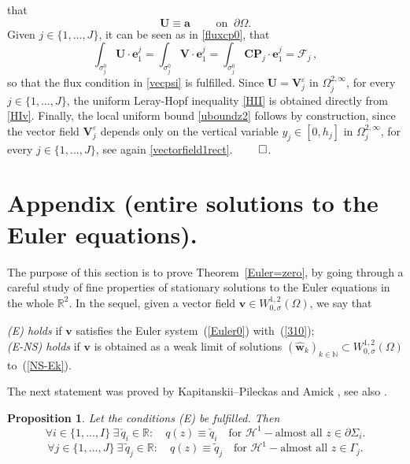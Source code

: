 \documentclass[11pt]{article}
\newtheorem{proposition}[theorem]{Proposition}
\numberwithin{equation}{section}
\numberwithin{figure}{section}
\newcommand{\R}{\mathbb{R}}
\def\R{{\mathbb R}}
\def\Fe{{\mathcal F}}
\def\Ha{{\mathscr H}}
\def\ve{{\mathbf v}}
\def\ee{{\mathbf e}}
\begin{document}
that $$\mathbf{U} \equiv \mathbf{a}\qquad\mbox{ on }\ \partial \Omega.$$ Given $j \in \{ 1,\dots,J\}$, it can be seen
as in \eqref{fluxcp0}, that
$$
\int_{\sigma_j^0} \mathbf{U} \cdot \ee_1^j = \int_{\sigma_j^0} \mathbf{V} \cdot \ee_1^j = \int_{\sigma_j^0} \mathbf{CP}_{j} \cdot \ee_1^j = \Fe_j \, ,
$$
so that the flux condition in \eqref{vecpsi} is fulfilled. Since $\mathbf{U} = \mathbf{V}^{\varepsilon}_{j}$ in
$\Omega_{j}^{2,\infty}$, for every $j \in \{ 1,\dots,J\}$, the uniform Leray-Hopf inequality \eqref{HII} is obtained directly from \eqref{HIv}.
Finally, the local uniform bound \eqref{uboundz2} follows by construction, since the vector field $\mathbf{V}^{\varepsilon}_{j}$ depends only
on the vertical variable $y_{j} \in [0,h_{j}]$ in $\Omega_{j}^{2,\infty}$, for every $j \in \{ 1,\dots,J\}$, see again \eqref{vectorfield1rect}.
\hfill$\qed$. 



\section{Appendix (entire solutions to the  Euler equations).} \label{poet2}
The purpose of this section is to prove Theorem~\ref{Euler=zero}, by going through a careful study of fine properties of stationary solutions to the Euler equations in the whole $\mathbb{R}^2$. In the sequel, given a vector field $\ve\in W_{0, \sigma}^{1,2}(\Omega)$, we say that
\begin{center}
	{\it {\rm (E)} holds} if $\ve$ satisfies the Euler system~(\ref{Euler0}) with~(\ref{310});\\[4pt]
	{\it {\rm (E-NS)} holds} if $\ve$ is obtained as a weak limit of solutions $(\widehat{\mathbf{w}}_k)_{k \in \mathbb{N}} \subset W_{0, \sigma}^{1,2}(\Omega)$ to~(\ref{NS-Ek}).
\end{center}

The next statement was proved by Kapitanskii--Pileckas \cite{kapitanskii1983spaces} and Amick \cite{amick1984existence}, see also \cite[Lemma~3.4.1]{korobkov2024steady}.

\begin{proposition}
\label{kmpTh2.3'} {\sl Let the conditions {\rm (E)} be fulfilled.
Then
\begin{equation} \label{bp2} \forall i\in\{1,\dots,I\} \ \exists\, \check q_i\in\R:\quad
q(z)\equiv \check q_i\quad\mbox{for }\Ha^1-\mbox{almost all }
z\in\partial\Sigma_i.\end{equation}
\begin{equation} \label{bp3} \forall j\in\{1,\dots,J\} \ \exists\, \tilde q_j\in\R:\quad
q(z)\equiv \tilde q_j\quad\mbox{for }\Ha^1-\mbox{almost all }
z\in\Gamma_j.\end{equation} }
\end{proposition}
\end{document}
